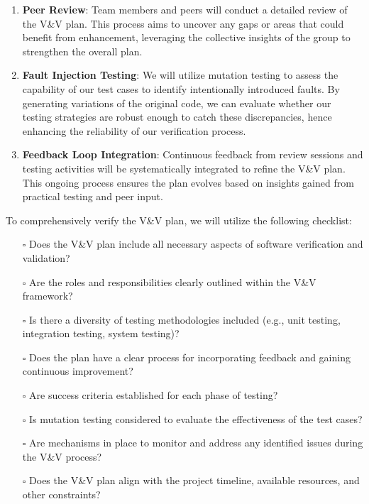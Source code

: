 \documentclass[12pt, titlepage]{article}
\begin{document}
\begin{enumerate}
  \item \textbf{Peer Review}: Team members and peers will conduct a
    detailed review of the V\&V plan. This process aims to uncover
    any gaps or areas that could benefit from enhancement, leveraging
    the collective insights of the group to strengthen the overall plan.

  \item \textbf{Fault Injection Testing}: We will utilize mutation
    testing to assess the capability of our test cases to identify
    intentionally introduced faults. By generating variations of the
    original code, we can evaluate whether our testing strategies are
    robust enough to catch these discrepancies, hence enhancing the
    reliability of our verification process.

  \item \textbf{Feedback Loop Integration}: Continuous feedback from
    review sessions and testing activities will be systematically
    integrated to refine the V\&V plan. This ongoing process ensures
    the plan evolves based on insights gained from practical testing
    and peer input.
\end{enumerate}

\noindent To comprehensively verify the V\&V plan, we will utilize
the following checklist:

\begin{itemize}
  \item[$\square$] Does the V\&V plan include all necessary aspects
    of software verification and validation?
  \item[$\square$] Are the roles and responsibilities clearly
    outlined within the V\&V framework?
  \item[$\square$] Is there a diversity of testing methodologies
    included (e.g., unit testing, integration testing, system testing)?
  \item[$\square$] Does the plan have a clear process for
    incorporating feedback and gaining continuous improvement?
  \item[$\square$] Are success criteria established for each phase of testing?
  \item[$\square$] Is mutation testing considered to evaluate the
    effectiveness of the test cases?
  \item[$\square$] Are mechanisms in place to monitor and address any
    identified issues during the V\&V process?
  \item[$\square$] Does the V\&V plan align with the project
    timeline, available resources, and other constraints?
\end{itemize}
\end{document}

